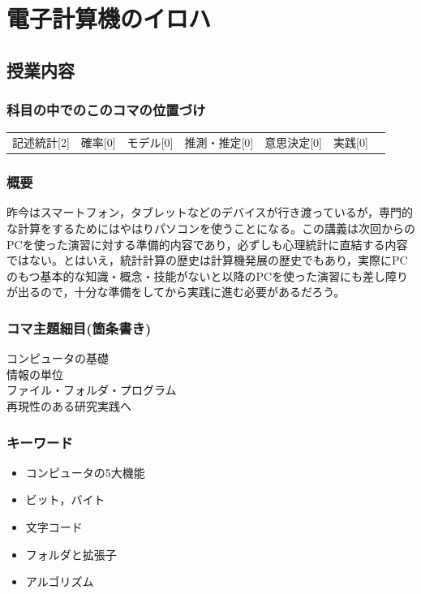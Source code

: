 \section{電子計算機のイロハ}
\label{interMission}

\subsection{授業内容}
\subsubsection{科目の中でのこのコマの位置づけ}
\begin{tabular}[t]{ccccccc}
    記述統計[2] & 確率[0] & モデル[0] & 推測・推定[0] & 意思決定[0] & 実践[0]
\end{tabular}
\subsubsection{概要}
昨今はスマートフォン，タブレットなどのデバイスが行き渡っているが，専門的な計算をするためにはやはりパソコンを使うことになる。この講義は次回からのPCを使った演習に対する準備的内容であり，必ずしも心理統計に直結する内容ではない。とはいえ，統計計算の歴史は計算機発展の歴史でもあり，実際にPCのもつ基本的な知識・概念・技能がないと以降のPCを使った演習にも差し障りが出るので，十分な準備をしてから実践に進む必要があるだろう。
\subsubsection{コマ主題細目(箇条書き)}
\begin{description}
    \item[コンピュータの基礎]
    \item[情報の単位]
    \item[ファイル・フォルダ・プログラム]
    \item[再現性のある研究実践へ]
\end{description}
\subsubsection{キーワード}
\begin{itemize}
\item コンピュータの5大機能
\item ビット，バイト
\item 文字コード
\item フォルダと拡張子
\item アルゴリズム
\end{itemize}
